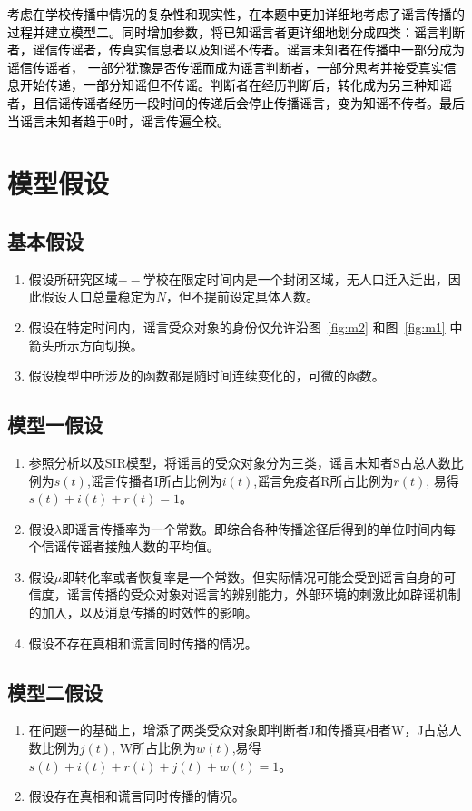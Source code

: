 \documentclass[withoutpreface,bwprint]{cumcmthesis}
\begin{document}
\textcolor{black}{考虑在学校传播中情况的复杂性和现实性，在本题中更加详细地考虑了谣言传播的过程并建立模型二。同时增加参数，将已知谣言者更详细地划分成四类：谣言判断者，谣信传谣者，传真实信息者以及知谣不传者。谣言未知者在传播中一部分成为谣信传谣者， 一部分犹豫是否传谣而成为谣言判断者，一部分思考并接受真实信息开始传递，一部分知谣但不传谣。判断者在经历判断后，转化成为另三种知谣者，且信谣传谣者经历一段时间的传递后会停止传播谣言，变为知谣不传者。最后当谣言未知者趋于0时，谣言传遍全校。}


\section{模型假设}
\subsection{基本假设}
\begin{enumerate}
	\item 假设所研究区域$--$学校在限定时间内是一个封闭区域，无人口迁入迁出，因此假设人口总量稳定为$N$，但不提前设定具体人数。
	\item 假设在特定时间内，谣言受众对象的身份仅允许沿图~\ref{fig:m2} 和图~\ref{fig:m1} 中箭头所示方向切换。
	\item 假设模型中所涉及的函数都是随时间连续变化的，可微的函数。
\end{enumerate}
\subsection{模型一假设}
\begin{enumerate}
  \item 参照分析以及SIR模型，将谣言的受众对象分为三类，谣言未知者S占总人数比例为$s(t)$,谣言传播者I所占比例为$i(t)$,谣言免疫者R所占比例为$r(t)$, 易得 $s(t)+i(t)+r(t) = 1$。
  \item 假设$\lambda$即谣言传播率为一个常数。即综合各种传播途径后得到的单位时间内每个信谣传谣者接触人数的平均值。
  \item 假设$\mu$即转化率或者恢复率是一个常数。但实际情况可能会受到谣言自身的可信度，谣言传播的受众对象对谣言的辨别能力，外部环境的刺激比如辟谣机制的加入，以及消息传播的时效性的影响。
  \item 假设不存在真相和谎言同时传播的情况。
\end{enumerate}
\subsection{模型二假设}
\begin{enumerate}
	\item 在问题一的基础上，增添了两类受众对象即判断者J和传播真相者W，J占总人数比例为$j(t)$, W所占比例为$w(t)$,易得 $s(t)+i(t)+r(t)+j(t)+w(t) = 1$。
	\item 假设存在真相和谎言同时传播的情况。
\end{enumerate}
\end{document}
